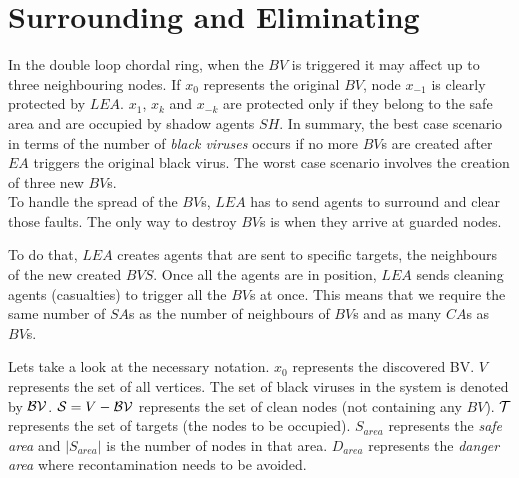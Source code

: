 \section{Surrounding and Eliminating}


In the double loop chordal ring, when the $BV$ is triggered it may affect  up to three neighbouring nodes.
If $x_0$ represents the original $BV$, node $x_{-1}$ is clearly protected by $LEA$. $x_{1} $, $x_{k}$ and $x_{-k}$ are protected only if they belong to the safe area and are occupied by shadow agents $SH$.
In summary, the best case scenario in terms of the number of  {\it black viruses} occurs if no more $BV$s are created after $EA$ triggers the original black virus. The worst case scenario involves the creation of three new $BV$s.  \\
To handle the spread of the $BV$s, $LEA$ has to send agents to surround and clear those faults. The only way to destroy $BV$s is when they arrive at guarded nodes.

To do that, $LEA$ creates agents that are sent to specific targets, the neighbours of the new created $BVS$. Once all the agents are in position,  $LEA$ sends cleaning agents (casualties) to trigger all the $BV$s at once. This means that we require the same number of $SA$s as the number of neighbours of  $BV$s  and as many $CA$s as $BV$s. 


Lets take a look at the necessary notation.  $x_0$ represents the discovered BV.  $V$ represents the set of all vertices. The set of black viruses in the system is denoted by  ${\cal BV}$.  ${\cal S} = V - {\cal BV}$ represents the set of  clean nodes (not containing any $BV$). ${\cal T}$ represents the set of targets (the nodes to be occupied). $S_{area}$ represents the {\it safe area} and  $\left\vert{S_{area}}\right\vert$ is the number of nodes in that area. $D_{area}$ represents the {\it danger area} where recontamination needs to be avoided.



